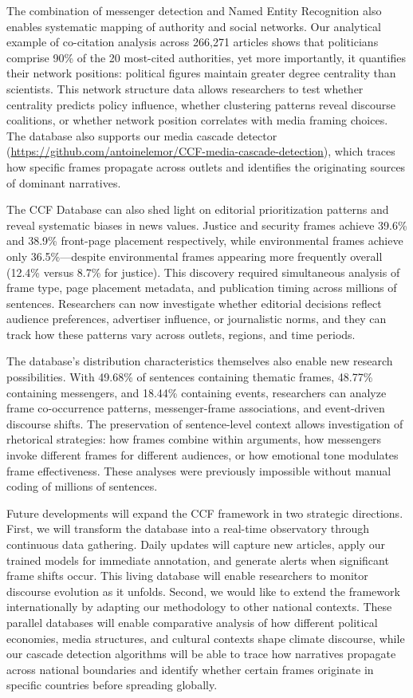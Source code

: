 \documentclass[12pt]{article}
\begin{document}
The combination of messenger detection and Named Entity Recognition also enables systematic mapping of authority and social networks. Our analytical example of co-citation analysis across 266,271 articles shows that politicians comprise 90\% of the 20 most-cited authorities, yet more importantly, it quantifies their network positions: political figures maintain greater degree centrality than scientists. This network structure data allows researchers to test whether centrality predicts policy influence, whether clustering patterns reveal discourse coalitions, or whether network position correlates with media framing choices. The database also supports our media cascade detector (\url{https://github.com/antoinelemor/CCF-media-cascade-detection}), which traces how specific frames propagate across outlets and identifies the originating sources of dominant narratives.

The CCF Database can also shed light on editorial prioritization patterns and reveal systematic biases in news values. Justice and security frames achieve 39.6\% and 38.9\% front-page placement respectively, while environmental frames achieve only 36.5\%—despite environmental frames appearing more frequently overall (12.4\% versus 8.7\% for justice). This discovery required simultaneous analysis of frame type, page placement metadata, and publication timing across millions of sentences. Researchers can now investigate whether editorial decisions reflect audience preferences, advertiser influence, or journalistic norms, and they can track how these patterns vary across outlets, regions, and time periods.

The database's distribution characteristics themselves also enable new research possibilities. With 49.68\% of sentences containing thematic frames, 48.77\% containing messengers, and 18.44\% containing events, researchers can analyze frame co-occurrence patterns, messenger-frame associations, and event-driven discourse shifts. The preservation of sentence-level context allows investigation of rhetorical strategies: how frames combine within arguments, how messengers invoke different frames for different audiences, or how emotional tone modulates frame effectiveness. These analyses were previously impossible without manual coding of millions of sentences.

Future developments will expand the CCF framework in two strategic directions. First, we will transform the database into a real-time observatory through continuous data gathering. Daily updates will capture new articles, apply our trained models for immediate annotation, and generate alerts when significant frame shifts occur. This living database will enable researchers to monitor discourse evolution as it unfolds. Second, we would like to extend the framework internationally by adapting our methodology to other national contexts. These parallel databases will enable comparative analysis of how different political economies, media structures, and cultural contexts shape climate discourse, while our cascade detection algorithms will be able to trace how narratives propagate across national boundaries and identify whether certain frames originate in specific countries before spreading globally. 
\end{document}
